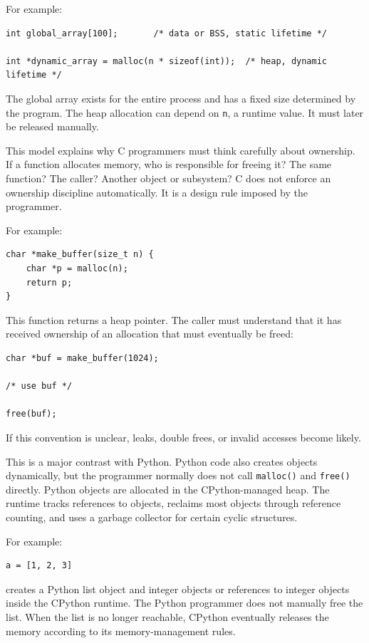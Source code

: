For example:

\begin{verbatim}
int global_array[100];       /* data or BSS, static lifetime */

int *dynamic_array = malloc(n * sizeof(int));  /* heap, dynamic lifetime */
\end{verbatim}

The global array exists for the entire process and has a fixed size determined by the program. The heap allocation can depend on \texttt{n}, a runtime value. It must later be released manually.

This model explains why C programmers must think carefully about ownership. If a function allocates memory, who is responsible for freeing it? The same function? The caller? Another object or subsystem? C does not enforce an ownership discipline automatically. It is a design rule imposed by the programmer.

For example:

\begin{verbatim}
char *make_buffer(size_t n) {
    char *p = malloc(n);
    return p;
}
\end{verbatim}

This function returns a heap pointer. The caller must understand that it has received ownership of an allocation that must eventually be freed:

\begin{verbatim}
char *buf = make_buffer(1024);

/* use buf */

free(buf);
\end{verbatim}

If this convention is unclear, leaks, double frees, or invalid accesses become likely.

This is a major contrast with Python. Python code also creates objects dynamically, but the programmer normally does not call \texttt{malloc()} and \texttt{free()} directly. Python objects are allocated in the CPython-managed heap. The runtime tracks references to objects, reclaims most objects through reference counting, and uses a garbage collector for certain cyclic structures.

For example:

\begin{verbatim}
a = [1, 2, 3]
\end{verbatim}

creates a Python list object and integer objects or references to integer objects inside the CPython runtime. The Python programmer does not manually free the list. When the list is no longer reachable, CPython eventually releases the memory according to its memory-management rules.

